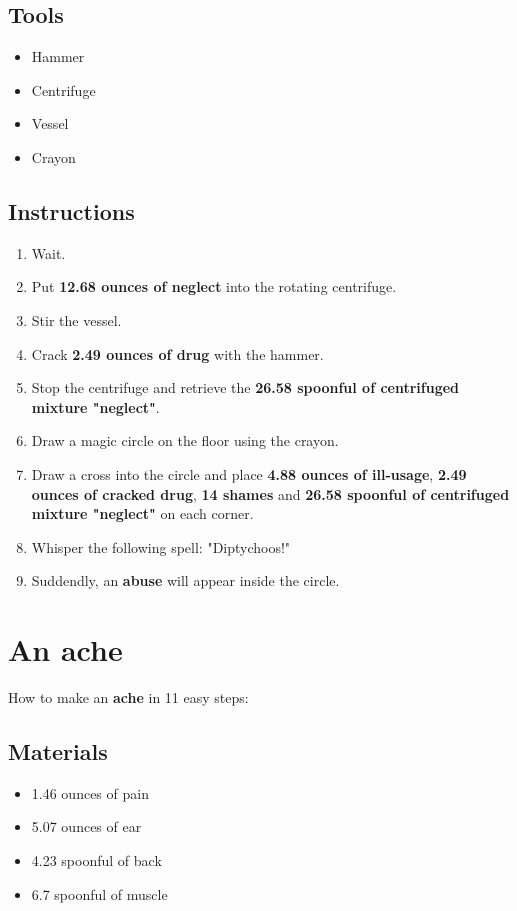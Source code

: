 \documentclass{article}
\begin{document}
\subsection{Tools}\begin{itemize}
\item 
Hammer
\item 
Centrifuge
\item 
Vessel
\item 
Crayon
\end{itemize}
\subsection{Instructions}\begin{enumerate}
\item 
Wait.
\item 
Put \textbf{12.68 ounces of neglect} into the rotating centrifuge.
\item 
Stir the vessel.
\item 
Crack \textbf{2.49 ounces of drug} with the hammer.
\item 
Stop the centrifuge and retrieve the \textbf{26.58 spoonful of centrifuged mixture "neglect"}.
\item 
Draw a magic circle on the floor using the crayon.
\item 
Draw a cross into the circle and place \textbf{4.88 ounces of ill-usage}, \textbf{2.49 ounces of cracked drug}, \textbf{14 shames} and \textbf{26.58 spoonful of centrifuged mixture "neglect"} on each corner.
\item 
Whisper the following spell: "Diptychoos!"
\item 
Suddendly, an \textbf{abuse} will appear inside the circle.
\end{enumerate}
\newpage
\section{An ache}How to make an \textbf{ache} in 11 easy steps:

\subsection{Materials}\begin{itemize}
\item 
1.46 ounces of pain
\item 
5.07 ounces of ear
\item 
4.23 spoonful of back
\item 
6.7 spoonful of muscle
\end{itemize}
\end{document}
